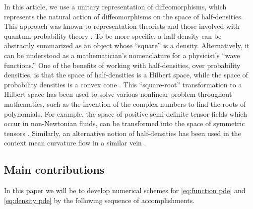 \documentclass[final,leqno]{siamltex1213}
\begin{document}
In this article, we use a unitary representation of diffeomorphisms, which represents the natural action of diffeomorphisms on the space of half-densities.
This approach was known to representation theorists \cite{VershilGelfandGraev1975,Ismagilov1975} and those involved with quantum probability theory \cite{Meyer1998,Parthasarathy2012}.
To be more specific, a half-density can be abstractly summarized as an object whose ``square'' is a density.
Alternatively, it can be understood as a mathematician's nomenclature for a physicist's ``wave functions.''
One of the benefits of working with half-densities, over probability densities, is that the space of half-densities is a Hilbert space, while the space of probability densities is a convex cone \cite{GuilleminSternberg1970}.
This ``square-root'' transformation to a Hilbert space has been used to solve various nonlinear problem throughout mathematics, such as the invention of the complex numbers to find the roots of polynomials.
For example, the space of positive semi-definite tensor fields which occur in non-Newtonian fluids, can be transformed into the space of symmetric tensors \cite{Balci2011}.
Similarly, an alternative notion of half-densities has been used in the context mean curvature flow in a similar vein \cite{Crane2013}.

\subsection{Main contributions}

In this paper we will be to develop numerical schemes for \eqref{eq:function pde} and \eqref{eq:density pde}
by the following sequence of accomplishments.
\end{document}
